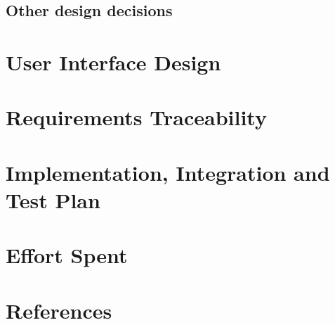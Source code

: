 \documentclass[table, 12pt]{article}
\begin{document}
\subsection{Other design decisions}

\section{User Interface Design}


\section{Requirements Traceability}


\section{Implementation, Integration and Test Plan}


\section{Effort Spent}


\section{References}
\end{document}
